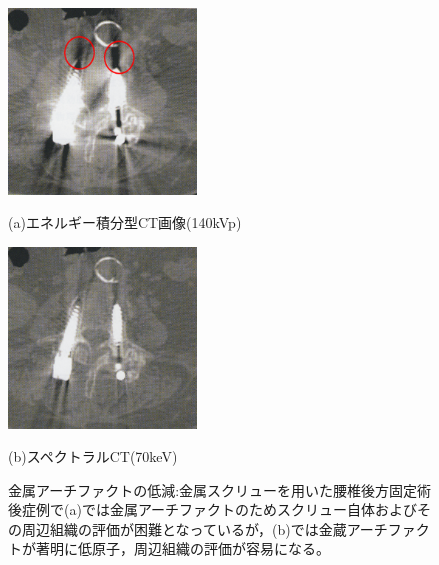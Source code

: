 \begin{figure}[H]
 \begin{minipage}{0.52\hsize}
  \begin{center}
   \includegraphics[width=5cm]{image/other/artifact_2.eps}
  \end{center}
  \vspace{-0.5cm}\hspace{1cm}
   (a)エネルギー積分型CT画像(140kVp)
 \end{minipage}
   \begin{minipage}{0.5\hsize}
  \begin{center}
   \includegraphics[width=5cm]{image/other/artifact_2_after.eps}
  \end{center}
  \vspace{-0.5cm}\hspace{2cm}
   (b)スペクトラルCT(70keV)
 \end{minipage}
 \begin{center}
  \vspace{-1zh}
  \caption{金属アーチファクトの低減\cite{spectralCT}:金属スクリューを用いた腰椎後方固定術後症例で(a)では金属アーチファクトのためスクリュー自体およびその周辺組織の評価が困難となっているが，(b)では金蔵アーチファクトが著明に低原子，周辺組織の評価が容易になる。}
  \label{fig:artifact_2}
  \end{center}
\end{figure}

